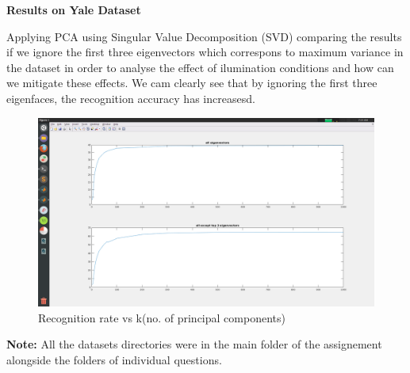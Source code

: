 \documentclass{article}
\begin{document}
\newpage

\textbf{Results on Yale Dataset}
\vskip 0.5in

Applying PCA using Singular Value Decomposition (SVD)  comparing the results if we ignore the first three eigenvectors which correspons to maximum variance in the dataset in order to analyse the effect of ilumination conditions and how can we mitigate these effects. 
We cam clearly see that by ignoring the first three eigenfaces, the recognition accuracy has increasesd.  
\begin{figure}[h!]
  \includegraphics[width=\linewidth]{Q1_yale.png}
  \caption{Recognition rate vs k(no. of principal components)}
  \label{fig:result2}
\end{figure}

\textbf{Note:} All the datasets directories were in the main folder of the assignement alongside the folders of individual questions. 
\end{document}
